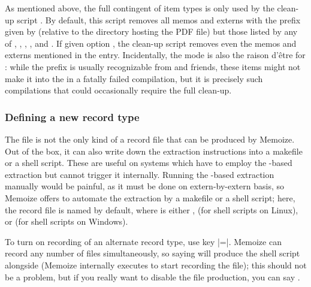 \documentclass[a4paper,11pt]{article}
\begin{document}
As mentioned above, the full contingent of  item
types is only used by the clean-up script .
By default, this script removes all memos and externs with the prefix given by
 (relative to the directory hosting the PDF file) but those
listed by any of , ,
, ,  and
.  If given option
, the clean-up script removes even the
memos and externs mentioned in the  entry.
Incidentally, the  mode is also the
raison d'être for : while the prefix is usually
recognizable from  and friends, these items might not
make it into the  in a fatally failed compilation,
but it is precisely such compilations that could occasionally require the full
clean-up.





\subsubsection{Defining a new record type}
\label{sec:new-record-file}

The \dmmz file is not the only kind of a record file that can be produced by
Memoize.  Out of the box, it can also write down the extraction instructions
into a makefile or a shell script.  These are useful on systems which have to
employ the -based extraction but cannot trigger it internally.
Running the -based extraction manually would be painful, as it must
be done on extern-by-extern basis, so Memoize offers to automate the extraction
by a makefile or a shell script; here, the record file is named
 by default,
where  is either ,
 (for shell scripts on Linux), or  (for
shell scripts on Windows).

To turn on recording of an alternate record type, use key
|=|.  Memoize can record any number of files
simultaneously, so saying  will
produce the shell script alongside \dmmz (Memoize internally executes
 to start recording the \dmmz file);
this should not be a problem, but if you really want to disable the \dmmz file
production, you can say .
\end{document}
